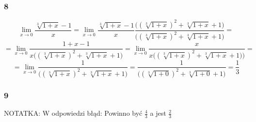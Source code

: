 \documentclass{article}
\begin{document}
\subsubsection*{8}

\begin{equation*}
    \lim_{x \to 0} \frac{\sqrt[3]{1+ x} - 1}{x} = \lim_{x \to 0} \frac{\sqrt[3]{1+ x} - 1}{x} \frac{\Bigg((\sqrt[3]{1+ x})^2 + \sqrt[3]{1+ x} + 1\Bigg)}{\Bigg((\sqrt[3]{1+ x})^2 + \sqrt[3]{1+ x} + 1\Bigg)} = 
\end{equation*}
\begin{equation*}
    = \lim_{x \to 0} \frac{1 + x - 1}{x \Big((\sqrt[3]{1+ x})^2 + \sqrt[3]{1+ x} + 1\Big)} = \lim_{x \to 0} \frac{x}{x \Big( (\sqrt[3]{1+ x})^2 + \sqrt[3]{1+ x} + 1)\Big)} =
\end{equation*}
\begin{equation*}
    = \lim_{x \to 0} \frac{1}{\Big( (\sqrt[3]{1+ x})^2 + \sqrt[3]{1+ x} + 1\Big)} = \frac{1}{\Big( (\sqrt[3]{1+ 0})^2 + \sqrt[3]{1+ 0} + 1\Big)} = \frac{1}{3}
\end{equation*}


\subsubsection*{9}

\begin{center}
    NOTATKA: W odpowiedzi błąd: Powinno być \(\frac{4}{3}\) a jest \(\frac{2}{3}\)
\end{center}
\end{document}
